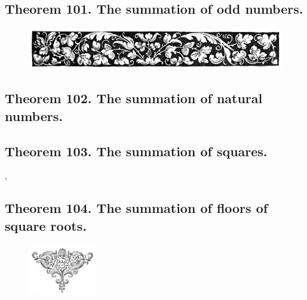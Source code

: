 \documentclass[preview]{standalone}
\begin{document}
\subsection[The summation of odd numbers is a square.]{
    \color{section} Theorem 101. \color{black} The summation of odd numbers.
}

\pagebreak

\begin{figure}[!h]
    \centering
    \includegraphics[width=14cm]{../resources/jpg/2.4.sequences.and.summations/border2.jpg}
\end{figure}
\subsection[The summation of natural numbers.]{
    \color{section} Theorem 102. \color{black} The summation of natural numbers.
}

\pagebreak


\subsection[The summation of squares.]{
    \color{section} Theorem 103. \color{black} The summation of squares.
}

\sep
\pagebreak


\subsection[The summation of floors of square roots.]{
    \color{section} Theorem 104. \color{black} The summation of floors of square roots.
}

\begin{figure}[!h]
    \centering
    \includegraphics[width=3cm]{../resources/jpg/2.4.sequences.and.summations/symbol6.jpg}
\end{figure}
\pagebreak
\end{document}
